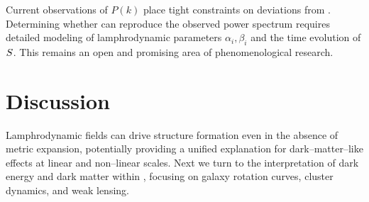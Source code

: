 Current observations of $P(k)$ place tight constraints on deviations
from \LCDM{}. Determining whether \rsvpabbr{} can reproduce the observed
power spectrum requires detailed modeling of lamphrodynamic parameters
$\alpha_i,\beta_i$ and the time evolution of $S$. This remains an
open and promising area of phenomenological research.

\section{Discussion}

Lamphrodynamic fields can drive structure formation even in the absence
of metric expansion, potentially providing a unified explanation for
dark--matter--like effects at linear and non--linear scales. Next we turn
to the interpretation of dark energy and dark matter within \rsvpabbr{},
focusing on galaxy rotation curves, cluster dynamics, and weak lensing.

\clearpage

